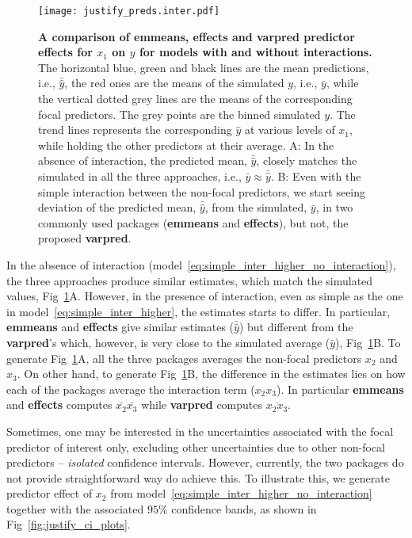 \documentclass[10pt,letterpaper]{article}
\newcommand{\pkg}[1]{\textbf{#1}}
\let\over=\overline
\begin{document}
\begin{figure}[!h]
\centering
\texttt{[image: justify\_preds.inter.pdf]}
\caption{{\bf A comparison of \pkg{emmeans}, \pkg{effects} and \pkg{varpred} predictor effects for $x_1$ on $y$ for models with and without interactions.}
The horizontal blue, green and black lines are the mean predictions, i.e., $\bar{\hat{y}}$, the red ones are the means of the simulated $y$, i.e., $\bar{y}$, while the vertical dotted grey lines are the means of the corresponding focal predictors. The grey points are the binned simulated $y$. The trend lines represents the corresponding $\hat{y}$ at various levels of $x_1$, while holding the other predictors at their average. A: In the absence of interaction, the predicted mean, $\bar{\hat{y}}$, closely matches the simulated in all the three approaches, i.e., $\bar{y} \approx \bar{\hat{y}}$. B: Even with the simple interaction between the non-focal predictors, we start seeing deviation of the predicted mean, $\bar{\hat{y}}$, from the simulated, $\bar{y}$, in two commonly used packages (\pkg{emmeans} and \pkg{effects}), but not, the proposed \pkg{varpred}.}
\label{fig:justify_plots}
\end{figure}

In the absence of interaction (model~\ref{eq:simple_inter_higher_no_interaction}), the three approaches produce similar estimates, which match the simulated values, Fig~\ref{fig:justify_plots}A. However, in the presence of interaction, even as simple as the one in model~\ref{eq:simple_inter_higher}, the estimates starts to differ. In particular, \pkg{emmeans} and \pkg{effects} give similar estimates ($\bar{\hat{y}}$) but different from the \pkg{varpred}'s which, however, is very close to the simulated average ($\bar{y}$), Fig~\ref{fig:justify_plots}B. To generate Fig~\ref{fig:justify_plots}A, all the three packages averages the non-focal predictors $x_2$ and $x_3$. On other hand, to generate Fig~\ref{fig:justify_plots}B, the difference in the estimates lies on how each of the packages average the interaction term ($x_2x_3$). In particular \pkg{emmeans} and \pkg{effects} computes $\bar{x_2}\bar{x_3}$ while \pkg{varpred} computes $\over{x_2x_3}$.

Sometimes, one may be interested in the uncertainties associated with the focal predictor of interest only, excluding other uncertainties due to other non-focal predictors -- \emph{isolated} confidence intervals. However, currently, the two packages do not provide straightforward way do achieve this. To illustrate this, we generate predictor effect of $x_2$ from model~\ref{eq:simple_inter_higher_no_interaction} together with the associated $95\%$ confidence bands, as shown in Fig~\ref{fig:justify_ci_plots}. 
\end{document}
